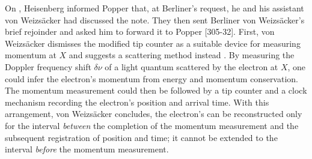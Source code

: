 \documentclass[pdflatex]{sn-jnl}
\newcommand{\vW}{von Weizsäcker\xspace}
\providecommand{\DIFdelend}{} %
\begin{document}


\DIFdelend On , Heisenberg informed Popper that, at Berliner’s request, he and his assistant \vW had discussed the note. They then sent Berliner \vW's brief rejoinder and asked him to forward it to Popper [305-32]. First, \vW dismisses the modified tip counter as a suitable device for measuring momentum at $X$ and suggests a scattering method instead \citep[808]{Weizsäcker1934}. By measuring the Doppler frequency shift $\delta\nu$ of a light quantum scattered by the electron at $X$, one could infer the electron's momentum from energy and momentum conservation. The momentum measurement could then be followed by a tip counter and a clock mechanism recording the electron's position and arrival time. With this arrangement, \vW concludes, the electron's  can be reconstructed only for the interval \emph{between} the completion of the momentum measurement and the subsequent registration of position and time; it cannot be extended to the interval \emph{before} the momentum measurement.
\end{document}
